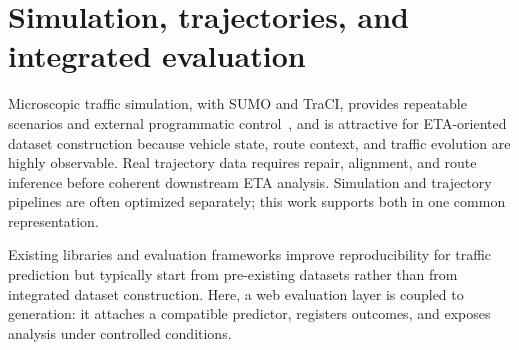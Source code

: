 \section{Simulation, trajectories, and integrated evaluation}
Microscopic traffic simulation, with SUMO and TraCI, provides repeatable scenarios and external programmatic control~\cite{sumo2011,traci2018}, and is attractive for ETA-oriented dataset construction because vehicle state, route context, and traffic evolution are highly observable. Real trajectory data requires repair, alignment, and route inference before coherent downstream ETA analysis. Simulation and trajectory pipelines are often optimized separately; this work supports both in one common representation.

Existing libraries and evaluation frameworks improve reproducibility for traffic prediction but typically start from pre-existing datasets rather than from integrated dataset construction. Here, a web evaluation layer is coupled to generation: it attaches a compatible predictor, registers outcomes, and exposes analysis under controlled conditions.

